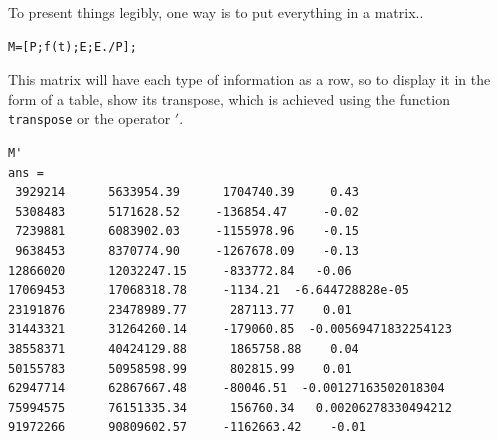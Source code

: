 To present things legibly, one way is to put everything in a matrix..
\begin{verbatim}
M=[P;f(t);E;E./P];
\end{verbatim}
This matrix will have each type of information as a row, so to display it in the form of a table, show its transpose, which is achieved using the function {\tt transpose} or the operator $'$.
\begin{verbatim}
M'
ans =
 3929214      5633954.39      1704740.39     0.43
 5308483      5171628.52     -136854.47     -0.02
 7239881      6083902.03     -1155978.96    -0.15
 9638453      8370774.90     -1267678.09    -0.13
12866020      12032247.15     -833772.84   -0.06
17069453      17068318.78     -1134.21  -6.644728828e-05
23191876      23478989.77      287113.77    0.01
31443321      31264260.14     -179060.85  -0.00569471832254123
38558371      40424129.88      1865758.88    0.04
50155783      50958598.99      802815.99    0.01
62947714      62867667.48     -80046.51  -0.00127163502018304
75994575      76151335.34      156760.34   0.00206278330494212
91972266      90809602.57     -1162663.42    -0.01
\end{verbatim}



